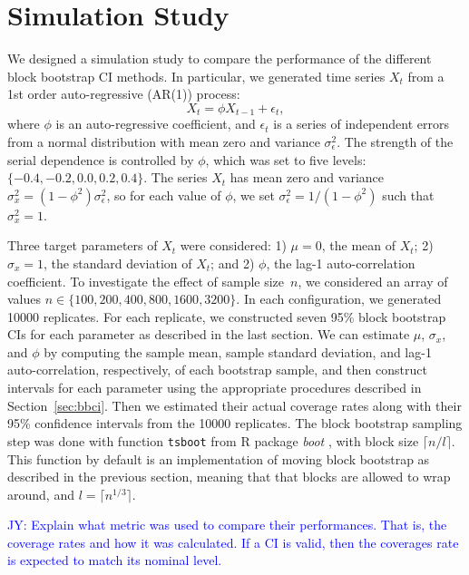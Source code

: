 \documentclass[12pt, letterpaper, titlepage]{article}
\newcommand{\jy}[1]{\textcolor{blue}{JY: #1}}
\begin{document}
\section{Simulation Study}
\label{sec:simu}

We designed a simulation study to compare the performance of the different
block
bootstrap CI methods. In particular, we generated time series $X_t$
from a 1st order auto-regressive (AR(1)) process:
\[
X_t = \phi X_{t-1} + \epsilon_t,
\]
where $\phi$ is an auto-regressive coefficient, and $\epsilon_t$ is a series of
independent errors from a normal distribution with mean zero and variance
$\sigma_{\epsilon}^2$. The strength of the serial dependence is controlled by
$\phi$, which was set to five levels: $\{-0.4, -0.2, 0.0, 0.2, 0.4\}$.
The series $X_t$ has mean zero and variance
$\sigma_x^2 = (1 - \phi^2) \sigma_{\epsilon}^2$, so for each value of $\phi$,
we
set $\sigma_{\epsilon}^2 = 1 / (1 - \phi^2)$ such that $\sigma_x^2 = 1$.

Three target parameters of $X_t$ were considered:
1) $\mu = 0$, the mean of $X_t$;
2) $\sigma_x = 1$, the standard deviation of $X_t$; and
2) $\phi$, the lag-1 auto-correlation coefficient.
To investigate the effect of sample size~$n$, we considered an array of values
$n \in \{100, 200, 400, 800, 1600, 3200\}$. In each configuration, we generated 
10000 replicates. For each replicate, we constructed seven 95\% block bootstrap
CIs for each parameter as described in the last section. We can estimate 
$\mu$, $\sigma_x$, and $\phi$ by computing the sample mean, sample 
standard deviation,
and lag-1 auto-correlation, respectively, of each bootstrap sample, and then 
construct intervals for each parameter using the appropriate procedures
described in Section~\ref{sec:bbci}.
Then we estimated their actual coverage rates along with their 95\% confidence
intervals from the 10000 replicates. The block bootstrap sampling step was done
with function \texttt{tsboot} from R package \textsl{boot} \citep{boot}, with
block size $\lceil n / l \rceil$. This function by default is an implementation
of moving block bootstrap as described in the previous section, meaning that
that blocks are allowed to wrap around, and $l = \lceil n^{1/3} \rceil$.

\jy{Explain what metric was used to compare their performances. That is, the
  coverage rates and how it was calculated. If a CI is valid, then the coverages
  rate is expected to match its nominal level.}
\end{document}
